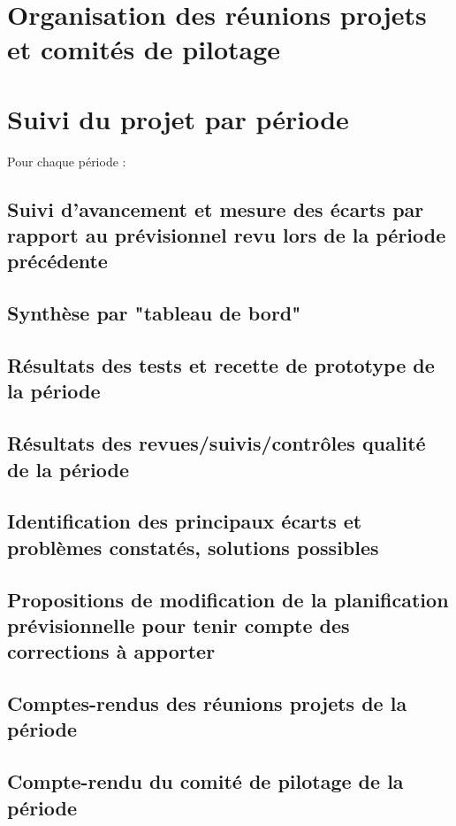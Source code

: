 \documentclass[11pt,a4paper,titlepage,openany]{report}
\begin{document}
    \section{Organisation des réunions projets et comités de pilotage}
    \section{Suivi du projet par période}
    Pour chaque période :
    \subsection{Suivi d’avancement et mesure des écarts par rapport au prévisionnel revu lors de la période précédente}

    \subsection{Synthèse par "tableau de bord"}

    \subsection{Résultats des tests et recette de prototype de la période}

    \subsection{Résultats des revues/suivis/contrôles qualité de la période}

    \subsection{Identification des principaux écarts et problèmes constatés, solutions possibles}

    \subsection{Propositions de modification de la planification prévisionnelle pour tenir compte des corrections à apporter}

    \subsection{Comptes-rendus des réunions projets de la période}

    \subsection{Compte-rendu du comité de pilotage de la période}
\end{document}

